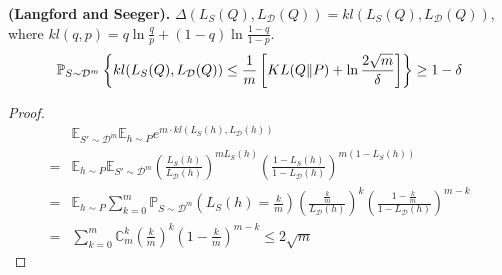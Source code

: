 \begin{corollary}
    \textbf{(Langford and Seeger).}
    $ \Delta(L_S(Q), L_{\mathcal{D}}(Q)) = kl(L_S(Q), L_{\mathcal{D}}(Q)) $, where $ kl(q,p) = q \ln \frac{q}{p} + (1 - q)\ln \frac{1 - q}{1 - p}  $.
    \[
        \mathbb{P}_{S \sim \mathcal{D}^{m}}\left\{ kl(L_{S}(Q), L_{\mathcal{D}}(Q)) \le \frac{1}{m} \left[ KL(Q \Arrowvert P) + \ln \frac{2 \sqrt m}{\delta}  \right] \right\} \ge 1 - \delta
    \]
    \begin{proof}
        \begin{align*}
            &\mathbb{E}_{S' \sim \mathcal{D}^m} \mathbb{E}_{h \sim P} e^{m \cdot kl(L_S(h), L_{\mathcal{D}}(h))}\\
            =& \mathbb{E}_{h \sim P} \mathbb{E}_{S' \sim \mathcal{D}^m} {\left( \frac{L_S(h)}{L_{\mathcal{D}}(h)}  \right)}^{m L_{S}(h)} {\left( \frac{1 - L_{S}(h)}{1 - L_{\mathcal{D}}(h)}  \right)}^{m(1 - L_{S}(h))}\\
            =& \mathbb{E}_{h \sim P} \sum^{m}_{k=0} \mathbb{P}_{S \sim \mathcal{D}^m} \left(L_{S}(h) = \frac{k}{m} \right){\left( \frac{\frac{k}{m} }{L_{\mathcal{D}}(h)}  \right)}^{k} {\left( \frac{1 - \frac{k}{m}}{1 - L_{\mathcal{D}}(h)}  \right)}^{m - k}\\
            =& \sum^{m}_{k=0}  \mathbb{C}^{k}_{m} {\left( \frac{k}{m}  \right)}^{k} {\left(1 - \frac{k}{m} \right)}^{m-k}
            \le 2\sqrt m
        \end{align*}
    \end{proof}
\end{corollary}

